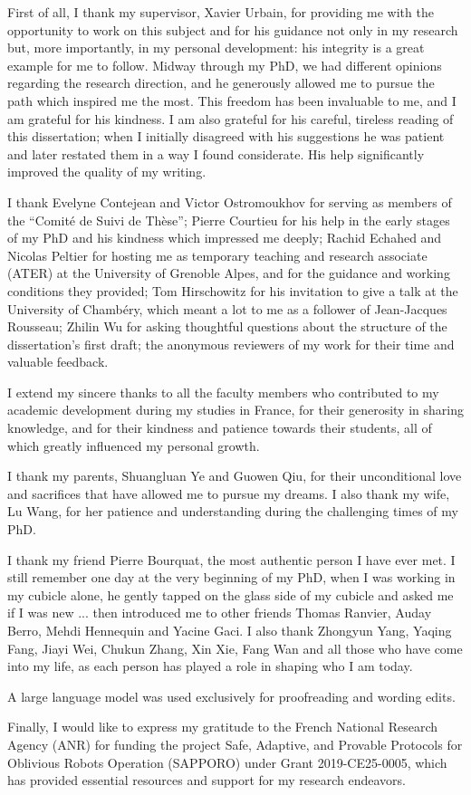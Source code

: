First of all, I thank my supervisor, Xavier Urbain, for providing me with the opportunity to work on this subject and for his guidance not only in my research but, more importantly, in my personal development: his integrity is a great example for me to follow. Midway through my PhD, we had different opinions regarding the research direction, and he generously allowed me to pursue the path which inspired me the most. This freedom has been invaluable to me, and I am grateful for his kindness. I am also grateful for his careful, tireless reading of this dissertation; when I initially disagreed with his suggestions he was patient and later restated them in a way I found considerate. His help significantly improved the quality of my writing.

I thank Evelyne Contejean and Victor Ostromoukhov for serving as members of the \enquote{Comité de Suivi de Thèse}; Pierre Courtieu for his help in the early stages of my PhD and his kindness which impressed me deeply; Rachid Echahed and Nicolas Peltier for hosting me as temporary teaching and research associate (ATER) at the University of Grenoble Alpes,
 and for the guidance and working conditions they provided;
Tom Hirschowitz for his invitation to give a talk at the University of Chambéry, which meant a lot to me as a follower of Jean-Jacques Rousseau; 
Zhilin Wu for asking thoughtful questions about the structure of the dissertation's first draft; the anonymous reviewers of my work for their time and valuable feedback.

I extend my sincere thanks to all the faculty members who contributed to my academic development during my studies in France, for their generosity in sharing knowledge, and for their kindness and patience towards their students, all of which greatly influenced my personal growth.

I thank my parents, Shuangluan Ye and Guowen Qiu, for their unconditional love and sacrifices that have allowed me to pursue my dreams. I also thank my wife, Lu Wang, for her patience and understanding during the challenging times of my PhD.

I thank my friend Pierre Bourquat, the most authentic person I have ever met. I still remember one day at the very beginning of my PhD, when I was working in my cubicle alone, he gently tapped on the glass side of my cubicle and asked me if I was new ... then introduced me to other friends Thomas Ranvier, Auday Berro, Mehdi Hennequin and Yacine Gaci. I also thank Zhongyun Yang, Yaqing Fang, Jiayi Wei, Chukun Zhang, Xin Xie, Fang Wan and all those who have come into my life, as each person has played a role in shaping who I am today.

A large language model was used exclusively for proofreading and wording edits.

Finally, I would like to express my gratitude to the French National Research Agency (ANR) for funding the project Safe, Adaptive, and Provable Protocols for Oblivious Robots Operation (SAPPORO) under Grant 2019-CE25-0005, which has provided essential resources and support for my research endeavors.  
